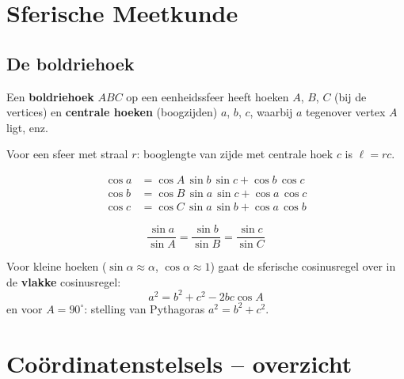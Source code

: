 \documentclass[11pt, a4paper]{article}
\newcommand{\graden}{^{\circ}}
\begin{document}
\section{Sferische Meetkunde}

\subsection{De boldriehoek}

Een \textbf{boldriehoek} $ABC$ op een eenheidssfeer heeft hoeken $A$, $B$, $C$ (bij de vertices) en \textbf{centrale hoeken} (boogzijden) $a$, $b$, $c$, waarbij $a$ tegenover vertex $A$ ligt, enz.

Voor een sfeer met straal $r$: booglengte van zijde met centrale hoek $c$ is $\ell = rc$.

\begin{formule}
\begin{align*}
  \cos a &= \cos A\,\sin b\,\sin c + \cos b\,\cos c \\
  \cos b &= \cos B\,\sin a\,\sin c + \cos a\,\cos c \\
  \cos c &= \cos C\,\sin a\,\sin b + \cos a\,\cos b
\end{align*}
\end{formule}

\begin{formule}[Sinusregel]
\[
  \frac{\sin a}{\sin A} = \frac{\sin b}{\sin B} = \frac{\sin c}{\sin C}
\]
\end{formule}

\begin{weetje}
Voor kleine hoeken ($\sin\alpha \approx \alpha$, $\cos\alpha \approx 1$) gaat de sferische cosinusregel over in de \textbf{vlakke} cosinusregel:
\[
  a^2 = b^2 + c^2 - 2bc\cos A
\]
en voor $A = 90\graden$: stelling van Pythagoras $a^2 = b^2 + c^2$.
\end{weetje}

\section{Coördinatenstelsels -- overzicht}
\end{document}

